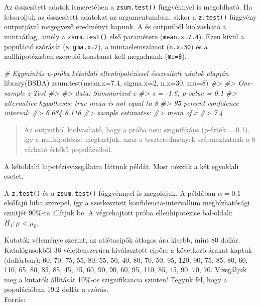 \documentclass[
]{book}
\newenvironment{Shaded}{\begin{snugshade}}{\end{snugshade}}
\newcommand{\AttributeTok}[1]{\textcolor[rgb]{0.77,0.63,0.00}{#1}}
\newcommand{\CommentTok}[1]{\textcolor[rgb]{0.56,0.35,0.01}{\textit{#1}}}
\newcommand{\DecValTok}[1]{\textcolor[rgb]{0.00,0.00,0.81}{#1}}
\newcommand{\FloatTok}[1]{\textcolor[rgb]{0.00,0.00,0.81}{#1}}
\newcommand{\FunctionTok}[1]{\textcolor[rgb]{0.00,0.00,0.00}{#1}}
\newcommand{\NormalTok}[1]{#1}
\providecommand{\tightlist}{%
  \setlength{\itemsep}{0pt}\setlength{\parskip}{0pt}}
\begin{document}
Az összesített adatok ismeretében a \texttt{zsum.test()} függvénnyel is megoldható. Ha felsoroljuk az összesített adatokat az argumentumban, akkor a \texttt{z.test()} függvény outputjával megegyező eredményt kapunk. A és outputból kiolvasható a mintaátlag, amely a \texttt{zsum.test()} első paramétere (\texttt{mean.x=7.4}). Ezen kívül a populáció szórását (\texttt{sigma.x=2}), a mintaelemszámot (\texttt{n.x=30}) és a nullhipotézisben szereplő konstanst kell megadnunk (\texttt{mu=8}).

\begin{Shaded}
\begin{Highlighting}[]
\CommentTok{\# Egymintás u{-}próba kétoldali ellenhipotézissel összesített adatok alapján}
\FunctionTok{library}\NormalTok{(BSDA)}
\FunctionTok{zsum.test}\NormalTok{(}\AttributeTok{mean.x=}\FloatTok{7.4}\NormalTok{, }\AttributeTok{sigma.x=}\DecValTok{2}\NormalTok{, }\AttributeTok{n.x=}\DecValTok{30}\NormalTok{, }\AttributeTok{mu=}\DecValTok{8}\NormalTok{)}
\CommentTok{\#\textgreater{} }
\CommentTok{\#\textgreater{}  One{-}sample z{-}Test}
\CommentTok{\#\textgreater{} }
\CommentTok{\#\textgreater{} data:  Summarized x}
\CommentTok{\#\textgreater{} z = {-}1.6, p{-}value = 0.1}
\CommentTok{\#\textgreater{} alternative hypothesis: true mean is not equal to 8}
\CommentTok{\#\textgreater{} 95 percent confidence interval:}
\CommentTok{\#\textgreater{}  6.684 8.116}
\CommentTok{\#\textgreater{} sample estimates:}
\CommentTok{\#\textgreater{} mean of x }
\CommentTok{\#\textgreater{}       7.4}
\end{Highlighting}
\end{Shaded}

\begin{quote}
Az outputból kiolvasható, hogy a próba nem szignifikáns (p-érték = 0.1), így a nullhipotézist megtartjuk, azaz a teszteredmények származhatnak a 8 várható értékű populációból.
\end{quote}

A kétoldalú hipotézisvizsgálatra láttunk példát. Most nézzük a két egyoldali esetet.

A \texttt{z.test()} és a \texttt{zsum.test()} függvénnyel is megoldjuk. A példában \(\alpha=0.1\) elsőfajú hiba szerepel, így a szerkesztett konfidencia-intervallum megbízhatósági szintjét 90\%-ra állítjuk be. A végrehajtott próba ellenhipotézise bal-oldali: \(H_1:\mu < \mu_0\).

\begin{description}
\tightlist
\item[Példa: Atlétacipők átlagos ára]
Kutatók véleménye szerint, az atlétacipők átlagos ára kisebb, mint 80 dollár. Katalógusokből 36 véletlenszerűen kiválasztott cipőre a következő árakat kaptuk (dollárban): 60, 70, 75, 55, 80, 55, 50, 40, 80, 70, 50, 95, 120, 90, 75, 85, 80, 60, 110, 65, 80, 85, 85, 45, 75, 60, 90, 90, 60, 95, 110, 85, 45, 90, 70, 70. Vizsgáljuk meg a kutatók állítását 10\%-os szignifikancia szinten! Tegyük fel, hogy a populációban 19.2 dollár a szórás.\\
Forrás:
\end{description}
\end{document}
